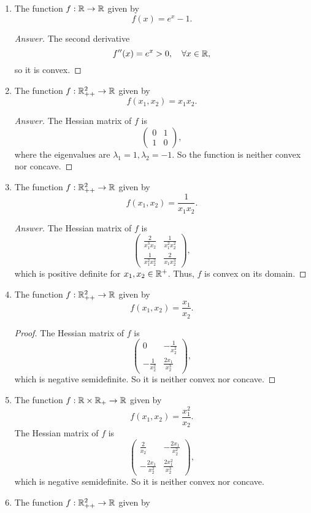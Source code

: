 \begin{enumerate}
	\item The function \(f: \mathbb{R} \to \mathbb{R}\) given by
	\[ f(x)=e^x-1. \]
	\begin{proof}[Answer]
	The second derivative
	\[f''(x)=e^x>0,\quad \forall x\in\mathbb{R}, \]
	so it is convex.
	\end{proof}
	\item The function \(f: \mathbb{R}_{++}^2 \to \mathbb{R}\) given by
	\[ f(x_1,x_2)=x_1 x_2. \]
	\begin{proof}[Answer]
	The Hessian matrix of \(f\) is
	\[ \begin{pmatrix} 0 & 1 \\ 1 & 0 \end{pmatrix}, \]
	where the eigenvalues are \(\lambda_1=1,\lambda_2=-1\).
	So the function is neither convex nor concave.
	\end{proof}
	\item The function \(f: \mathbb{R}_{++}^2 \to \mathbb{R}\) given by
	\[ f(x_1,x_2)=\frac{1}{x_1 x_2}. \]
	\begin{proof}[Answer]
	The Hessian matrix of \(f\) is
	\[ \begin{pmatrix} \frac{2}{x_1^3 x_2} & \frac{1}{x_1^2 x_2^2} \\ \frac{1}{x_1^2 x_2^2} & \frac{2}{x_1 x_2^3} \end{pmatrix}, \]
	which is positive definite for \(x_1,x_2\in\mathbb{R}^{+}\).
	Thus, \(f\) is convex on its domain.
	\end{proof}
	\item The function \(f: \mathbb{R}_{++}^2 \to \mathbb{R}\) given by
	\[ f(x_1,x_2)=\frac{x_1}{x_2}. \]
	\begin{proof}
	The Hessian matrix of \(f\) is
	\[ \begin{pmatrix} 0 & -\frac{1}{x_2^2} \\ -\frac{1}{x_2^2} & \frac{2x_1}{x_2^3} \end{pmatrix}, \]
	which is negative semidefinite.
	So it is neither convex nor concave.
	\end{proof}
	\item The function \(f: \mathbb{R}\times\mathbb{R}_+ \to \mathbb{R}\) given by
	\[ f(x_1,x_2)=\frac{x_1^2}{x_2}. \]
	The Hessian matrix of \(f\) is
	\[ \begin{pmatrix} \frac{2}{x_2} & -\frac{2x_1}{x_2^2} \\ -\frac{2x_1}{x_2^2} & \frac{2x_1^2}{x_2^3} \end{pmatrix}, \]
	which is negative semidefinite.
	So it is neither convex nor concave.
	\item The function \(f: \mathbb{R}_{++}^2 \to \mathbb{R}\) given by

\end{enumerate}
